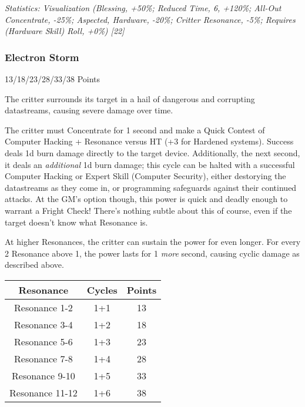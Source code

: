\begin{multicols*}{3}
	\textcolor{OliveGreen}{\textit{Statistics: Visualization (Blessing, +50\%; Reduced Time, 6, +120\%; All-Out Concentrate, -25\%; Aspected, Hardware, -20\%; Critter Resonance, -5\%; Requires (Hardware Skill) Roll, +0\%) [22] }}

	\subsubsection{Electron Storm}\label{electron_storm}
	\begin{flushright}
		13/18/23/28/33/38 Points
	\end{flushright}

	The critter surrounds its target in a hail of dangerous and corrupting datastreams, causing severe damage over time.
	
	The critter must Concentrate for 1 second and make a Quick Contest of Computer Hacking + Resonance versus HT (+3 for Hardened systems). Success deals 1d burn damage directly to the target device. Additionally, the next second, it deals an \textit{additional} 1d burn damage; this cycle can be halted with a successful Computer Hacking or Expert Skill (Computer Security), either destorying the datastreams as they come in, or programming safeguards against their continued attacks. At the GM's option though, this power is quick and deadly enough to warrant a Fright Check! There's nothing subtle about this of course, even if the target doesn't know what Resonance is.
	
	At higher Resonances, the critter can sustain the power for even longer. For every 2 Resonance above 1, the power lasts for 1 \textit{more} second, causing cyclic damage as described above.
	
	 	\begin{center}
	 	\begin{tabular}{|c|c|c|}
	 		\hline
	 		Resonance & Cycles & Points \\
	 		\hline
	 		\hline
	 		Resonance 1-2 & 1+1 & 13 \\
	 		Resonance 3-4 & 1+2 & 18 \\
	 		Resonance 5-6 & 1+3 & 23 \\
	 		Resonance 7-8 & 1+4 & 28 \\
	 		Resonance 9-10 & 1+5 & 33 \\
	 		Resonance 11-12 & 1+6 & 38 \\
	 		\hline
	 	\end{tabular}
	 \end{center}


\end{multicols*}
